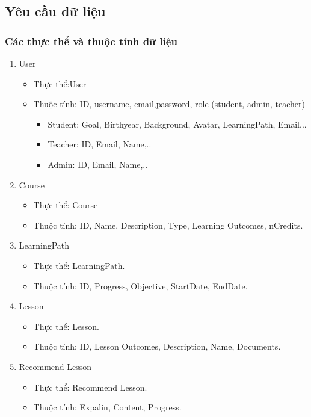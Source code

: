 \subsection{Yêu cầu dữ liệu}
\subsubsection{Các thực thể và thuộc tính dữ liệu}
\begin{enumerate}
    \item User
    \begin{itemize}
        \item Thực thể:User
        \item Thuộc tính: ID, username, email,password, role (student, admin, teacher)
        \begin{itemize}
            \item Student: Goal, Birthyear, Background, Avatar, LearningPath, Email,..
            \item Teacher: ID, Email, Name,..  
            \item Admin: ID, Email, Name,..
        \end{itemize}
    \end{itemize}
    \item Course
    \begin{itemize}
        \item Thực thể: Course
        \item Thuộc tính: ID, Name, Description, Type, Learning Outcomes, nCredits.
    \end{itemize}
    \item LearningPath
    \begin{itemize}
        \item Thực thể: LearningPath.
        \item Thuộc tính: ID, Progress, Objective, StartDate, EndDate.
    \end{itemize}
    \item Lesson
    \begin{itemize}
        \item Thực thể: Lesson.
        \item Thuộc tính: ID, Lesson Outcomes, Description, Name, Documents.
    \end{itemize}
    \item Recommend Lesson
    \begin{itemize}
        \item Thực thể: Recommend Lesson.
        \item Thuộc tính: Expalin, Content, Progress.

\end{itemize}
\end{enumerate}
